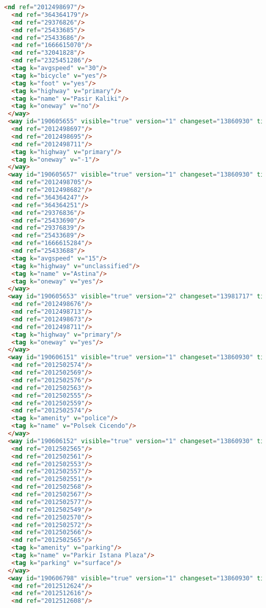 \begin{lstlisting}[language=HTML,basicstyle=\tiny,caption=bandung1.xml]
  <nd ref="2012498697"/>
  <nd ref="364364179"/>
  <nd ref="29376826"/>
  <nd ref="25433685"/>
  <nd ref="25433686"/>
  <nd ref="1666615070"/>
  <nd ref="32041828"/>
  <nd ref="2325451286"/>
  <tag k="avgspeed" v="30"/>
  <tag k="bicycle" v="yes"/>
  <tag k="foot" v="yes"/>
  <tag k="highway" v="primary"/>
  <tag k="name" v="Pasir Kaliki"/>
  <tag k="oneway" v="no"/>
 </way>
 <way id="190605655" visible="true" version="1" changeset="13860930" timestamp="2012-11-13T15:42:42Z" user="yudiwbs" uid="268765">
  <nd ref="2012498697"/>
  <nd ref="2012498695"/>
  <nd ref="2012498711"/>
  <tag k="highway" v="primary"/>
  <tag k="oneway" v="-1"/>
 </way>
 <way id="190605657" visible="true" version="1" changeset="13860930" timestamp="2012-11-13T15:42:42Z" user="yudiwbs" uid="268765">
  <nd ref="2012498705"/>
  <nd ref="2012498682"/>
  <nd ref="364364247"/>
  <nd ref="364364251"/>
  <nd ref="29376836"/>
  <nd ref="25433690"/>
  <nd ref="29376839"/>
  <nd ref="25433689"/>
  <nd ref="1666615284"/>
  <nd ref="25433688"/>
  <tag k="avgspeed" v="15"/>
  <tag k="highway" v="unclassified"/>
  <tag k="name" v="Astina"/>
  <tag k="oneway" v="yes"/>
 </way>
 <way id="190605653" visible="true" version="2" changeset="13981717" timestamp="2012-11-22T06:24:04Z" user="yudiwbs" uid="268765">
  <nd ref="2012498676"/>
  <nd ref="2012498713"/>
  <nd ref="2012498673"/>
  <nd ref="2012498711"/>
  <tag k="highway" v="primary"/>
  <tag k="oneway" v="yes"/>
 </way>
 <way id="190606151" visible="true" version="1" changeset="13860930" timestamp="2012-11-13T15:47:31Z" user="yudiwbs" uid="268765">
  <nd ref="2012502574"/>
  <nd ref="2012502569"/>
  <nd ref="2012502576"/>
  <nd ref="2012502563"/>
  <nd ref="2012502555"/>
  <nd ref="2012502559"/>
  <nd ref="2012502574"/>
  <tag k="amenity" v="police"/>
  <tag k="name" v="Polsek Cicendo"/>
 </way>
 <way id="190606152" visible="true" version="1" changeset="13860930" timestamp="2012-11-13T15:47:31Z" user="yudiwbs" uid="268765">
  <nd ref="2012502565"/>
  <nd ref="2012502561"/>
  <nd ref="2012502553"/>
  <nd ref="2012502557"/>
  <nd ref="2012502551"/>
  <nd ref="2012502568"/>
  <nd ref="2012502567"/>
  <nd ref="2012502577"/>
  <nd ref="2012502549"/>
  <nd ref="2012502570"/>
  <nd ref="2012502572"/>
  <nd ref="2012502566"/>
  <nd ref="2012502565"/>
  <tag k="amenity" v="parking"/>
  <tag k="name" v="Parkir Istana Plaza"/>
  <tag k="parking" v="surface"/>
 </way>
 <way id="190606798" visible="true" version="1" changeset="13860930" timestamp="2012-11-13T15:51:18Z" user="yudiwbs" uid="268765">
  <nd ref="2012512624"/>
  <nd ref="2012512616"/>
  <nd ref="2012512608"/>

\end{lstlisting}
